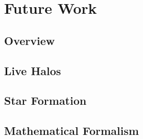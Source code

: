 \chapter{Future Work}\label{sec:future}

\section{Overview}


\section{Live Halos}


\section{Star Formation}


\section{Mathematical Formalism}

